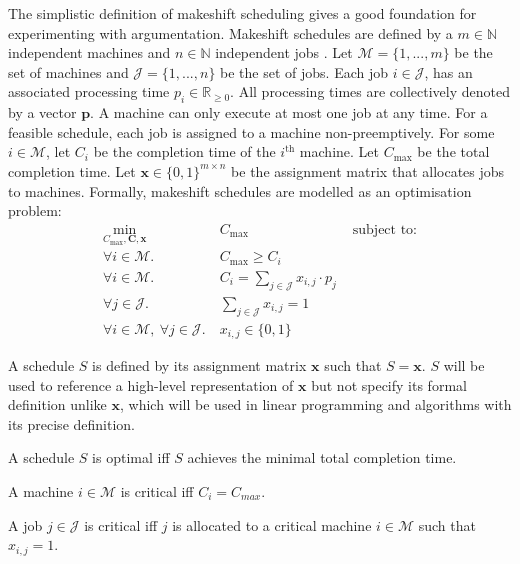 The simplistic definition of makeshift scheduling gives a good foundation for experimenting with argumentation. Makeshift schedules are defined by a $m\in\mathbb{N}$ independent machines and $n\in\mathbb{N}$ independent jobs \cite{sa}. Let $\mathcal{M}=\{1,...,m\}$ be the set of machines and $\mathcal{J}=\{1,...,n\}$ be the set of jobs. Each job $i\in\mathcal{J}$, has an associated processing time $p_i\in\mathbb{R}_{\geq 0}$. All processing times are collectively denoted by a vector $\mathbf{p}$. A machine can only execute at most one job at any time. For a feasible schedule, each job is assigned to a machine non-preemptively. For some $i\in\mathcal{M}$, let $C_i$ be the completion time of the $i^\text{th}$ machine. Let $C_{\max}$ be the total completion time. Let $\mathbf{x}\in\{0,1\}^{m\times n}$ be the assignment matrix that allocates jobs to machines. Formally, makeshift schedules are modelled as an optimisation problem:
\begin{align*}
	\min_{C_{\max},\mathbf{C},\mathbf{x}}&C_{\max}&\text{ subject to:}\\
	\forall i\in\mathcal{M}.\ &C_{\max}\geq C_i\\
	\forall i\in\mathcal{M}.\ &C_i=\sum_{j\in\mathcal{J}}x_{i,j}\cdot p_j\\
	\forall j\in\mathcal{J}.\ &\sum_{j\in\mathcal{J}}x_{i,j}=1\\
	\forall i\in\mathcal{M},\ \forall j\in\mathcal{J}.\ &x_{i,j}\in\{0,1\}
\end{align*}

\begin{definition}
	A schedule $S$ is defined by its assignment matrix $\mathbf{x}$ such that $S=\mathbf{x}$. $S$ will be used to reference a high-level representation of $\mathbf{x}$ but not specify its formal definition unlike $\mathbf{x}$, which will be used in linear programming and algorithms with its precise definition.
\end{definition}

\begin{definition}
	A schedule $S$ is optimal iff $S$ achieves the minimal total completion time.
\end{definition}


\begin{definition}
	A machine $i\in\mathcal{M}$ is critical iff $C_i=C_{max}$.
\end{definition}

\begin{definition}
	A job $j\in\mathcal{J}$ is critical iff $j$ is allocated to a critical machine $i\in\mathcal{M}$ such that $x_{i,j}=1$.
\end{definition}

